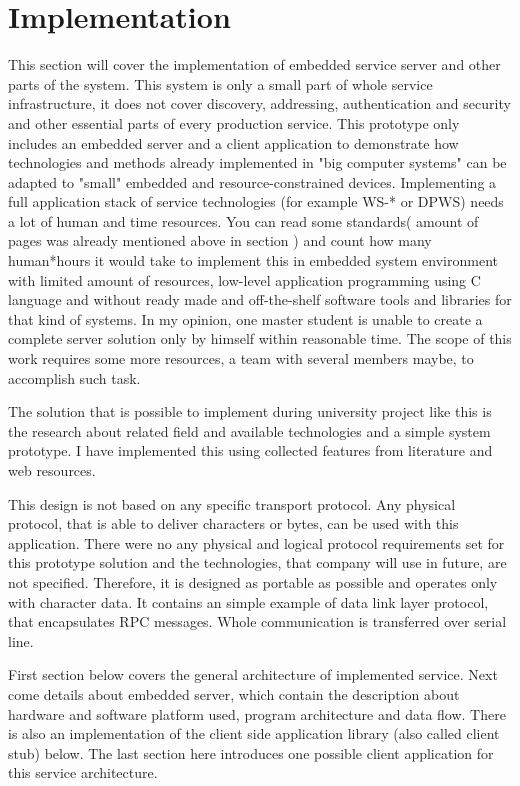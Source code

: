 \newpage
\section{Implementation}
\label{sec:implementation}
This section will cover the implementation of embedded service server and other
parts of the system. This system is only a small part of whole service
infrastructure, it does not cover discovery, addressing, authentication and
security and other essential parts of every production service.
This prototype only includes an embedded server and a client application to
demonstrate how technologies and methods already implemented in "big computer
systems" can be adapted to "small" embedded and resource-constrained devices.
Implementing a full application stack of service technologies (for example WS-*
or \gls{DPWS}) needs a lot of human and time resources. You can read
some standards( amount of pages was already mentioned above in section
) and count how many
human*hours it would take to implement this in embedded system environment with limited amount of resources, low-level
application programming using C language and without ready made and
off-the-shelf software tools and libraries for that kind of systems. In my opinion, one master student
is unable to create a complete server solution only by himself within reasonable
time. The scope of this work requires some more resources, a team with several
members maybe, to accomplish such task.

The solution that is possible to implement during university project like this
is the research about related field and available technologies and a simple
system prototype.
I have implemented this using collected features from literature and web
resources.

This design is not based on any specific transport protocol.
Any physical protocol, that is able to deliver characters or bytes, can be used with this application.
There were no any physical and logical protocol requirements set for this prototype solution and the technologies, that company will use in future, are not specified.
Therefore, it is designed as portable as possible and operates only with character data.
It contains an simple example of data link layer protocol, that encapsulates RPC messages. 
Whole communication is transferred over serial line.


First section below covers the general architecture of implemented service.
Next come details about embedded server, which contain the description about
hardware and software platform used, program architecture and data flow.
There is also an implementation of the client side application library (also
called client stub) below.
The last section here introduces one possible client application for
this service architecture.






